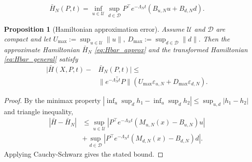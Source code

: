 \documentclass[10pt,a4paper]{amsart}
\newtheorem{proposition}{Proposition}
\begin{document}
\begin{equation}
    \bar H_N(P,t)
    =
    \inf_{u\in\mathcal U}
    \sup_{d\in\mathcal D}
    P^\top e^{-\Lambda_N t}
    (B_{u,N} u+B_{d,N} d).
    \label{eq:Hbar_approx}
\end{equation}

\begin{proposition}[Hamiltonian approximation error]\label{thm:propos1}
    Assume $\mathcal U$ and $\mathcal D$ are compact and let
    \(
    U_{\max}:=\sup_{u\in\mathcal U}\|u\|,
    \
    D_{\max}:=\sup_{d\in\mathcal D}\|d\|.
    \)
    Then the approximate Hamiltonian $\bar H_N$ \eqref{eq:Hbar_approx} and the transformed Hamiltonian \eqref{eq:Hbar_general} satisfy
    \begin{equation}
        \begin{aligned}
            |\bar H(X,P,t)-&\bar H_N(P,t)| \le \\
            &\|e^{-\Lambda_N^\top t}P\|
            \left(
            U_{\max}\varepsilon_{u,N}
            +
            D_{\max}\varepsilon_{d,N}
            \right).
        \end{aligned}
    \end{equation}
\end{proposition}

\begin{proof}
    By the minimax property $|\inf_u \sup_d h_1 - \inf_u \sup_d h_2| \le \sup_{u,d} |h_1 - h_2|$ and triangle inequality, 
    \begin{align*}
        |\bar H - \bar H_N| 
        &\le \sup_{u\in\mathcal U} \left| P^\top e^{-\Lambda_N t} (M_{u,N}(x) - B_{u,N})u \right| \\
        &+ \sup_{d\in\mathcal D} \left| P^\top e^{-\Lambda_N t} (M_{d,N}(x) - B_{d,N})d \right|.
    \end{align*}
    Applying Cauchy-Schwarz gives the stated bound.
\end{proof}
\end{document}
